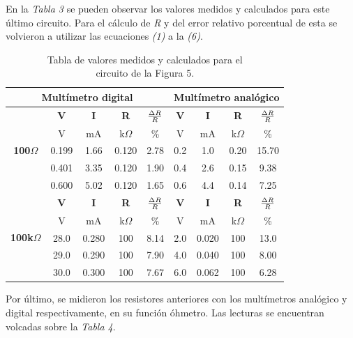 \documentclass{article}
\begin{document}
\noindent En la \textit{Tabla 3} se pueden observar los valores medidos y calculados para este último circuito. Para el cálculo de \textit{R} y del error relativo porcentual de esta se volvieron a utilizar las ecuaciones \textit{(1)} a la \textit{(6)}.
\bigskip\medskip

\newpage
\begin{table}[!hbt]
	\begin{center}

		\begin{tabular}{|c|c|c|c|c|c|c|c|c|} \hline
			\multicolumn{5}{|c|}{\textbf{Multímetro digital}} & \multicolumn{4}{c|}{\textbf{Multímetro analógico}} \\ \hline
			\multirow{5}{*}{\textbf{100$\Omega$}} 
			& \textbf{V} & \textbf{I} & \textbf{R} & \textbf{${\Delta R \over R}$} & \textbf{V} & \textbf{I} & \textbf{R} & \textbf{${\Delta R \over R}$} \\\cline{2-9}
			& V & mA & k$\Omega$ & \% & V & mA & k$\Omega$ & \% \\\cline{2-9}
			& 0.199 & 1.66 & 0.120 & 2.78 & 0.2 & 1.0 & 0.20 & 15.70 \\\cline{2-9}
			& 0.401 & 3.35 & 0.120 & 1.90 & 0.4 & 2.6 & 0.15 &  9.38 \\\cline{2-9}
			& 0.600 & 5.02 & 0.120 & 1.65 & 0.6 & 4.4 & 0.14 & 7.25 \\ \hline
			\multirow{5}{*}{\textbf{100k$\Omega$}} 
			& \textbf{V} & \textbf{I} & \textbf{R} & \textbf{${\Delta R \over R}$} & \textbf{V} & \textbf{I} & \textbf{R} & \textbf{${\Delta R \over R}$} \\\cline{2-9}
			& V & mA & k$\Omega$ & \% & V & mA & k$\Omega$ & \% \\\cline{2-9}
			& 28.0 & 0.280 & 100 & 8.14 & 2.0 & 0.020 & 100 & 13.0 \\\cline{2-9}
			& 29.0 & 0.290 & 100 & 7.90 & 4.0 & 0.040 & 100 & 8.00\\\cline{2-9}
			& 30.0 & 0.300 & 100 & 7.67 & 6.0 & 0.062 & 100 & 6.28 \\ \hline
		\end{tabular}

	\caption{Tabla de valores medidos y calculados para el\\ circuito de la Figura 5.}
	\end{center}
\end{table}
\bigskip




	Por último, se midieron los resistores anteriores con los multímetros analógico y digital respectivamente, en su función óhmetro. Las lecturas se encuentran volcadas sobre la \textit{Tabla 4}.
\bigskip\bigskip
\end{document}
